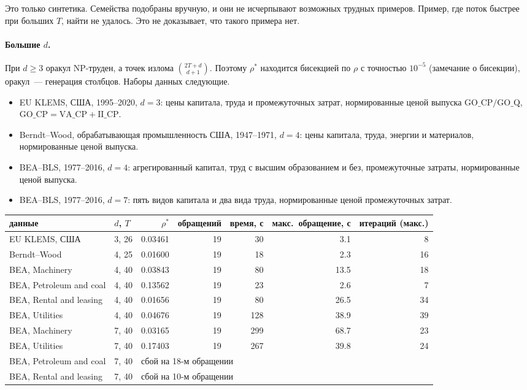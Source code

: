 \documentclass[a4paper,11pt]{article}
\theoremstyle{plain}
\theoremstyle{definition}
\theoremstyle{remark}
\begin{document}
Это только синтетика. Семейства подобраны вручную, и они не исчерпывают возможных трудных примеров. Пример, где поток быстрее при больших $T$, найти не удалось. Это не доказывает, что такого примера нет.

\paragraph{Большие $d$.} При $d\ge3$ оракул NP-труден, а точек излома $\binom{2T+d}{d+1}$. Поэтому $\rho^*$ находится бисекцией по $\rho$ с точностью $10^{-5}$ (замечание о бисекции), оракул~--- генерация столбцов. Наборы данных следующие.
\begin{itemize}
    \item EU KLEMS, США, 1995--2020, $d=3$: цены капитала, труда и промежуточных затрат, нормированные ценой выпуска $\mathrm{GO\_CP}/\mathrm{GO\_Q}$, $\mathrm{GO\_CP}=\mathrm{VA\_CP}+\mathrm{II\_CP}$.
    \item Berndt--Wood, обрабатывающая промышленность США, 1947--1971, $d=4$: цены капитала, труда, энергии и материалов, нормированные ценой выпуска.
    \item BEA--BLS, 1977--2016, $d=4$: агрегированный капитал, труд с высшим образованием и без, промежуточные затраты, нормированные ценой выпуска.
    \item BEA--BLS, 1977--2016, $d=7$: пять видов капитала и два вида труда, нормированные ценой промежуточных затрат.
\end{itemize}
\begin{center}
\begin{tabular}{llrrrrr}
    \toprule
    данные & $d$, $T$ & $\rho^*$ & обращений & время, с & макс.\ обращение, с & итераций (макс.) \\
    \midrule
    EU KLEMS, США & 3, 26 & 0.03461 & 19 & 30 & 3.1 & 8 \\
    Berndt--Wood & 4, 25 & 0.01600 & 19 & 18 & 2.3 & 16 \\
    BEA, Machinery & 4, 40 & 0.03843 & 19 & 80 & 13.5 & 18 \\
    BEA, Petroleum and coal & 4, 40 & 0.13562 & 19 & 23 & 2.6 & 7 \\
    BEA, Rental and leasing & 4, 40 & 0.01656 & 19 & 80 & 26.5 & 34 \\
    BEA, Utilities & 4, 40 & 0.04676 & 19 & 128 & 38.9 & 39 \\
    BEA, Machinery & 7, 40 & 0.03165 & 19 & 299 & 68.7 & 23 \\
    BEA, Utilities & 7, 40 & 0.17403 & 19 & 267 & 39.8 & 24 \\
    BEA, Petroleum and coal & 7, 40 & \multicolumn{4}{l}{сбой на 18-м обращении} \\
    BEA, Rental and leasing & 7, 40 & \multicolumn{4}{l}{сбой на 10-м обращении} \\
    \bottomrule
\end{tabular}
\end{center}
\end{document}
